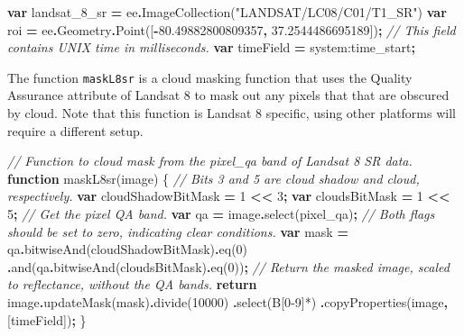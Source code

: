 \documentclass[
]{article}
\newenvironment{Shaded}{\begin{snugshade}}{\end{snugshade}}
\newcommand{\AttributeTok}[1]{\textcolor[rgb]{0.77,0.63,0.00}{#1}}
\newcommand{\CommentTok}[1]{\textcolor[rgb]{0.56,0.35,0.01}{\textit{#1}}}
\newcommand{\ControlFlowTok}[1]{\textcolor[rgb]{0.13,0.29,0.53}{\textbf{#1}}}
\newcommand{\DecValTok}[1]{\textcolor[rgb]{0.00,0.00,0.81}{#1}}
\newcommand{\FloatTok}[1]{\textcolor[rgb]{0.00,0.00,0.81}{#1}}
\newcommand{\FunctionTok}[1]{\textcolor[rgb]{0.00,0.00,0.00}{#1}}
\newcommand{\KeywordTok}[1]{\textcolor[rgb]{0.13,0.29,0.53}{\textbf{#1}}}
\newcommand{\NormalTok}[1]{#1}
\newcommand{\OperatorTok}[1]{\textcolor[rgb]{0.81,0.36,0.00}{\textbf{#1}}}
\newcommand{\StringTok}[1]{\textcolor[rgb]{0.31,0.60,0.02}{#1}}
\begin{document}
\begin{Shaded}
\begin{Highlighting}[]
\KeywordTok{var}\NormalTok{ landsat\_8\_sr }\OperatorTok{=}\NormalTok{ ee}\OperatorTok{.}\FunctionTok{ImageCollection}\NormalTok{(}\StringTok{"LANDSAT/LC08/C01/T1\_SR"}\NormalTok{)}
\KeywordTok{var}\NormalTok{ roi }\OperatorTok{=}\NormalTok{ ee}\OperatorTok{.}\AttributeTok{Geometry}\OperatorTok{.}\FunctionTok{Point}\NormalTok{([}\OperatorTok{{-}}\FloatTok{80.49882800809357}\OperatorTok{,} \FloatTok{37.2544486695189}\NormalTok{])}\OperatorTok{;}
\CommentTok{// This field contains UNIX time in milliseconds.}
\KeywordTok{var}\NormalTok{ timeField }\OperatorTok{=} \StringTok{\textquotesingle{}system:time\_start\textquotesingle{}}\OperatorTok{;}
\end{Highlighting}
\end{Shaded}

The function \texttt{maskL8sr} is a cloud masking function that uses the Quality Assurance attribute of Landsat 8 to mask out any pixels that that are obscured by cloud. Note that this function is Landsat 8 specific, using other platforms will require a different setup.

\begin{Shaded}
\begin{Highlighting}[]
\CommentTok{// Function to cloud mask from the pixel\_qa band of Landsat 8 SR data.}
\KeywordTok{function} \FunctionTok{maskL8sr}\NormalTok{(image) \{}
  \CommentTok{// Bits 3 and 5 are cloud shadow and cloud, respectively.}
  \KeywordTok{var}\NormalTok{ cloudShadowBitMask }\OperatorTok{=} \DecValTok{1} \OperatorTok{\textless{}\textless{}} \DecValTok{3}\OperatorTok{;}
  \KeywordTok{var}\NormalTok{ cloudsBitMask }\OperatorTok{=} \DecValTok{1} \OperatorTok{\textless{}\textless{}} \DecValTok{5}\OperatorTok{;}
  \CommentTok{// Get the pixel QA band.}
  \KeywordTok{var}\NormalTok{ qa }\OperatorTok{=}\NormalTok{ image}\OperatorTok{.}\FunctionTok{select}\NormalTok{(}\StringTok{\textquotesingle{}pixel\_qa\textquotesingle{}}\NormalTok{)}\OperatorTok{;}
  \CommentTok{// Both flags should be set to zero, indicating clear conditions.}
  \KeywordTok{var}\NormalTok{ mask }\OperatorTok{=}\NormalTok{ qa}\OperatorTok{.}\FunctionTok{bitwiseAnd}\NormalTok{(cloudShadowBitMask)}\OperatorTok{.}\FunctionTok{eq}\NormalTok{(}\DecValTok{0}\NormalTok{)}
  \OperatorTok{.}\FunctionTok{and}\NormalTok{(qa}\OperatorTok{.}\FunctionTok{bitwiseAnd}\NormalTok{(cloudsBitMask)}\OperatorTok{.}\FunctionTok{eq}\NormalTok{(}\DecValTok{0}\NormalTok{))}\OperatorTok{;}
  \CommentTok{// Return the masked image, scaled to reflectance, without the QA bands.}
  \ControlFlowTok{return}\NormalTok{ image}\OperatorTok{.}\FunctionTok{updateMask}\NormalTok{(mask)}\OperatorTok{.}\FunctionTok{divide}\NormalTok{(}\DecValTok{10000}\NormalTok{)}
  \OperatorTok{.}\FunctionTok{select}\NormalTok{(}\StringTok{\textquotesingle{}B[0{-}9]*\textquotesingle{}}\NormalTok{)}
  \OperatorTok{.}\FunctionTok{copyProperties}\NormalTok{(image}\OperatorTok{,}\NormalTok{ [timeField])}\OperatorTok{;}
\NormalTok{\}}
\end{Highlighting}
\end{Shaded}
\end{document}
